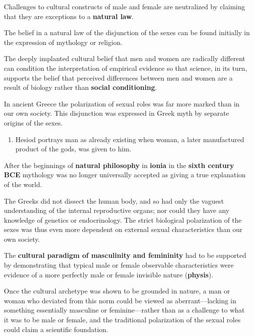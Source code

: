Challenges to cultural constructs of male and female are neutralized by claiming that they are exceptions to a \textbf{natural law}.

\begin{nte}
    The belief in a natural law of the disjunction of the sexes can be found initially in the expression of mythology or religion.
\end{nte}

The deeply implanted cultural belief that men and women are radically different can condition the interpretation of empirical evidence so that science, in its turn, supports the belief that perceived differences between men and women are a result of biology rather than \textbf{social conditioning}.

\begin{rmk}
    In ancient Greece the polarization of sexual roles was far more marked than in our own society. This disjunction was expressed in Greek myth by separate origins of the sexes. \begin{enumerate}
        \item Hesiod portrays man as already existing when woman, a later manufactured product of the gods, was given to him.
    \end{enumerate}
\end{rmk}

After the beginnings of \textbf{natural philosophy} in \textbf{ionia} in the \textbf{sixth century BCE} mythology was no longer universally accepted as giving a true explanation of the world.

\begin{nte}
    The Greeks did not dissect the human body, and so had only the vaguest understanding of the internal reproductive organs; nor could they have any knowledge of genetics or endocrinology. The strict biological polarization of the sexes was thus even more dependent on external sexual characteristics than our own society.
\end{nte}

The \textbf{cultural paradigm of masculinity and femininity} had to be supported by demonstrating that typical male or female observable characteristics were evidence of a more perfectly male or female invisible nature (\textbf{physis}). 

\begin{rmk}
    Once the cultural archetype was shown to be grounded in nature, a man or woman who deviated from this norm could be viewed as aberrant---lacking in something essentially masculine or feminine---rather than as a challenge to what it was to be male or female, and the traditional polarization of the sexual roles could claim a scientific foundation.
\end{rmk}

